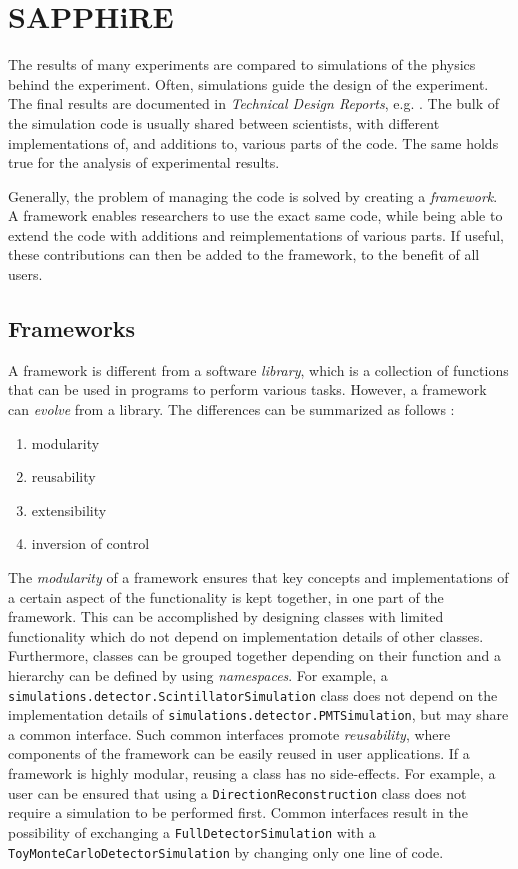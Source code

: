 \section{SAPPHiRE}

The results of many experiments are compared to simulations of the physics
behind the experiment.  Often, simulations guide the design of the experiment.
The final results are documented in \emph{Technical Design Reports}, e.g.
\cite[29]{Atlas:TDR}. The bulk of the simulation code is usually shared between
scientists, with different implementations of, and additions to, various parts
of the code.  The same holds true for the analysis of experimental results.

Generally, the problem of managing the code is solved by creating a
\emph{framework}.  A framework enables researchers to use the exact same code,
while being able to extend the code with additions and reimplementations of
various parts.  If useful, these contributions can then be added to the
framework, to the benefit of all users.


\subsection{Frameworks}

A framework is different from a software \emph{library}, which is a collection
of functions that can be used in programs to perform various tasks.  However, a
framework can \emph{evolve} from a library.  The differences can be summarized
as follows \cite{Fayad:1997}:
\begin{enumerate}
    \item modularity
    \item reusability
    \item extensibility
    \item inversion of control
\end{enumerate}
%
The \emph{modularity} of a framework ensures that key concepts and
implementations of a certain aspect of the functionality is kept together, in
one part of the framework.  This can be accomplished by designing classes with
limited functionality which do not depend on implementation details of other
classes.  Furthermore, classes can be grouped together depending on their
function and a hierarchy can be defined by using \emph{namespaces}.  For
example, a \verb|simulations.detector.ScintillatorSimulation| class does not
depend on the implementation details of
\verb|simulations.detector.PMTSimulation|, but may share a common interface.
Such common interfaces promote \emph{reusability}, where components of the
framework can be easily reused in user applications.  If a framework is highly
modular, reusing a class has no side-effects.  For example, a user can be
ensured that using a \verb|DirectionReconstruction| class does not require a
simulation to be performed first.  Common interfaces result in the possibility
of exchanging a \verb|FullDetectorSimulation| with a
\verb|ToyMonteCarloDetectorSimulation| by changing only one line of code.

